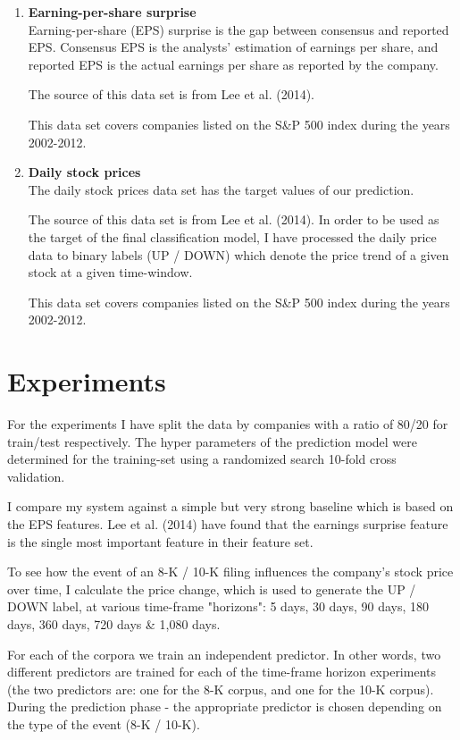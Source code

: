 \documentclass[11pt,a4paper]{article}
\begin{document}
\begin{enumerate}
  \item \textbf{Earning-per-share surprise} \\
Earning-per-share (EPS) surprise is the gap between consensus and reported EPS. Consensus EPS is the analysts’ estimation of earnings per share, and reported EPS is the actual earnings
per share as reported by the company.

The source of this data set is from Lee et al. (2014).

This data set covers companies listed on the S\&P 500 index during the years 2002-2012.
  \item \textbf{Daily stock prices} \\ 
The daily stock prices data set has the target values of our prediction. 

The source of this data set is from Lee et al. (2014). In order to be used as the target of the final classification model, I have processed the daily price data to binary labels (UP / DOWN) which denote the price trend of a given stock at a given time-window.

This data set covers companies listed on the S\&P 500 index during the years 2002-2012.
\end{enumerate}
\section{Experiments}
For the experiments I have split the data by companies with a ratio of 80/20 for train/test respectively. The hyper parameters of the prediction model were determined for the training-set using a randomized search 10-fold cross validation.

I compare my system against a simple but
very strong baseline which is based on the EPS features. Lee et al. (2014) have found that the earnings surprise
feature is the single most important feature in their feature set.

To see how the event of an 8-K / 10-K filing influences the company's stock price over time, I calculate the price change, which is used to generate the UP / DOWN label, at various time-frame "horizons": 5 days, 30 days, 90 days, 180 days, 360 days, 720 days \& 1,080 days.

For each of the corpora we train an independent predictor. In other words, two different predictors are trained for each of the time-frame horizon experiments (the two predictors are: one for the 8-K corpus, and one for the 10-K corpus). During the prediction phase - the appropriate predictor is chosen depending on the type of the event (8-K / 10-K).
\end{document}
